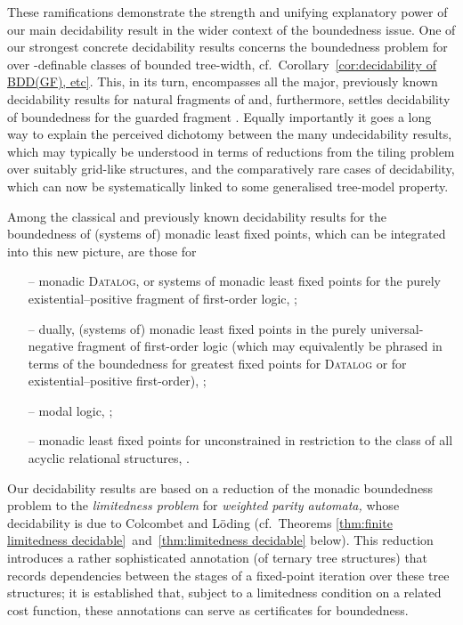 \documentclass{LMCS}
\begin{document}
These ramifications demonstrate the strength and unifying explanatory
power of our main decidability result in the wider context of the
boundedness issue.
One of our strongest concrete decidability results
concerns the boundedness problem for  over
-definable classes of bounded tree-width, cf.~Corollary~\ref{cor:decidability of BDD(GF), etc}.
This, in its turn,
encompasses all the major, previously known decidability results
for natural fragments of  and, furthermore, settles decidability
of boundedness for the guarded fragment .
Equally importantly it goes a long way
to explain the perceived dichotomy between the many undecidability
results, which may typically be understood in terms of reductions from
the tiling problem over suitably grid-like structures, and the
comparatively rare cases of decidability, which can now be systematically
linked to some generalised tree-model property.

Among the classical and previously known decidability results
for the boundedness of (systems of) monadic least fixed points,
which can be integrated into this new picture, are those for
\begin{itemize}
\item[--] monadic \textsc{Datalog,} or systems of monadic least fixed points
  for the purely existential--positive fragment of first-order logic,
  \cite{CosmadakisGaKaVa88}\?;
\item[--] dually, (systems of) monadic least fixed points
  in the purely universal-negative fragment of first-order logic
  (which may equivalently be phrased in terms of the
  boundedness for greatest fixed points for \textsc{Datalog} or for
  existential--positive first-order), \cite{Otto06}\?;
\item[--] modal logic, \cite{Otto99}\?;
\item[--] monadic least fixed points for unconstrained 
  in restriction to the class of all acyclic relational structures, \cite{KOS}.
\end{itemize}

\noindent Our decidability results are based on a reduction of the monadic
boundedness problem to the \emph{limitedness problem} for
\emph{weighted parity automata,} whose decidability is due to
Colcombet and L\"oding \cite{ColcombetLoeding08}
(cf.~Theorems
\ref{thm:finite limitedness decidable}~and~\ref{thm:limitedness decidable}
below).
This reduction introduces a rather sophisticated annotation
(of ternary tree structures) that records dependencies between the stages
of a fixed-point iteration over these tree structures\?; it is
established that, subject to a limitedness condition on a related
cost function, these annotations can serve as certificates for boundedness.
\end{document}
